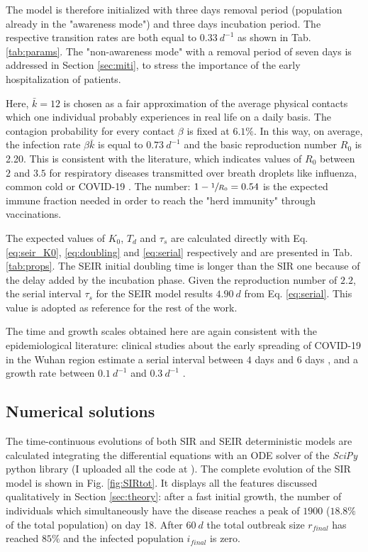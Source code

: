 \documentclass[DIV=12, BCOR=0pt]{scrartcl}  %
\begin{document}
  The model is therefore initialized with three days removal period (population already in the "awareness mode") and three days incubation period. 
  The respective transition rates are both equal to $0.33 \ d^{-1}$ as shown in Tab. \ref{tab:params}. 
  The "non-awareness mode" with a removal period of seven days is addressed in Section \ref{sec:miti}, to stress the importance of the early hospitalization of patients. 
  
 
  Here, $\bar{k} = 12$ is chosen as a fair approximation of the average physical contacts which one individual probably experiences in real life on a daily basis. The contagion probability for every contact $\beta$ is fixed at $6.1 \%$. In this way, on average, the infection rate $\beta \bar{k}$ is equal to $0.73 \ d^{-1}$ and the basic reproduction number $R_0$ is 2.20. This is consistent with the literature, which indicates values of $R_0$ between $2$ and $3.5$ for respiratory diseases transmitted over breath droplets like influenza, common cold or COVID-19 \citep{Hilton2020, Sanche2020, Firth2020}. 
  The number: $1 - \sfrac{1}{R_0} = 0.54 $ is the expected immune fraction needed in order to reach the "herd immunity" through vaccinations.
  
  The expected values of $K_0$, $T_d$ and $\tau_s$ are calculated directly with Eq. \ref{eq:seir_K0}, \ref{eq:doubling} and \ref{eq:serial} respectively and are presented in Tab. \ref{tab:props}. The SEIR initial doubling time is longer than the SIR one because of the delay added by the incubation phase. Given the reproduction number of $2.2$, the serial interval $\tau_s$ for the SEIR model results $4.90 \ d$ from Eq. \ref{eq:serial}. This value is adopted as reference for the rest of the work.
  
  The time and growth scales obtained here are again consistent with the epidemiological literature: clinical studies about the early spreading of COVID-19 in the Wuhan region estimate a serial interval between $4$ days \citep{Du2020} and $6$ days \citep{Firth2020}, and a growth rate between $0.1 \ d^{-1}$ \citep{Du2020} and $0.3 \ d^{-1}$ \citep{Sanche2020}.
    
  
  \subsection{Numerical solutions}
	The time-continuous evolutions of both SIR and SEIR deterministic models are calculated integrating the differential equations with an ODE solver of the \textit{SciPy} python library (I uploaded all the code at \citet{pyndemic}). 	%
	The complete evolution of the SIR model is shown in Fig. \ref{fig:SIRtot}. It displays all the features discussed qualitatively in Section \ref{sec:theory}: after a fast initial growth, the number of individuals which simultaneously have the disease reaches a peak of $1900$ ($18.8 \%$ of the total population) on day 18. After $60 \ d$ the total outbreak size $r_{final}$ has reached $85 \%$ and the infected population $i_{final}$ is zero.
	
\end{document}
